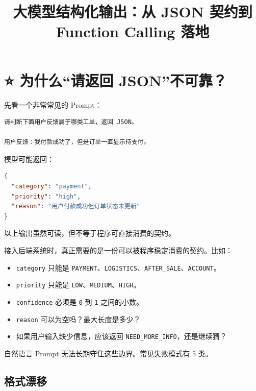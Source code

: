 \documentclass[9pt,a4paper,twocolumn]{ctexart}
\begin{document}
\title{大模型结构化输出：从 JSON 契约到 Function Calling 落地}
\date{}
\maketitle
{}

\section*{⭐️ 为什么“请返回 JSON”不可靠？}


先看一个非常常见的 Prompt：



\begin{lstlisting}
请判断下面用户反馈属于哪类工单，返回 JSON。

用户反馈：我付款成功了，但是订单一直显示待支付。
\end{lstlisting}



模型可能返回：



\begin{lstlisting}[language=json]
{
  "category": "payment",
  "priority": "high",
  "reason": "用户付款成功但订单状态未更新"
}
\end{lstlisting}



以上输出虽然可读，但不等于程序可直接消费的契约。



接入后端系统时，真正需要的是一份可以被程序稳定消费的契约。比如：


\begin{itemize}[itemsep=1pt, topsep=2pt]
  \item \texttt{category} 只能是 \texttt{PAYMENT}、\texttt{LOGISTICS}、\texttt{AFTER\_SALE}、\texttt{ACCOUNT}。
  \item \texttt{priority} 只能是 \texttt{LOW}、\texttt{MEDIUM}、\texttt{HIGH}。
  \item \texttt{confidence} 必须是 \texttt{0} 到 \texttt{1} 之间的小数。
  \item \texttt{reason} 可以为空吗？最大长度是多少？
  \item 如果用户输入缺少信息，应该返回 \texttt{NEED\_MORE\_INFO}，还是继续猜？
\end{itemize}


自然语言 Prompt 无法长期守住这些边界。常见失败模式有 5 类。



\subsection*{格式漂移}
\end{document}
